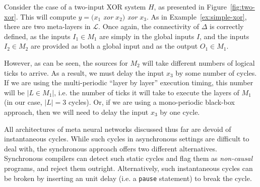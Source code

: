 \begin{example}
	\label{ex:timing}
	Consider the case of a two-input XOR system $H$, as presented in Figure~\ref{fig:two-xor}.
	This will compute $y = \big(x_1$ \textit{xor} $x_2\big)$ \textit{xor} $x_3$.
	As in Example~\ref{ex:simple-xor}, there are two meta-layers in $\mathcal{L}$. 
	Once again, the connectivity of $\Delta$ is correctly defined, as the inputs $I_1 \in M_1$ are simply in the global inputs $I$, and the inputs $I_2 \in M_2$ are provided as both a global input and as the output $O_1 \in M_1$.  
	
	However, as can be seen, the sources for $M_2$ will take different numbers of logical ticks to arrive.
	As a result, we must delay the input $x_3$ by some number of cycles.
	If we are using the multi-periodic ``layer by layer'' execution timing, this number will be $|L \in M_1|$, i.e. the number of ticks it will take to execute the layers of $M_1$ (in our case, $|L| = 3$ cycles). 
	Or, if we are using a mono-periodic black-box approach, then we will need to delay the input $x_3$ by one cycle.
\end{example}

All architectures of meta neural networks discussed thus far are
devoid of instantaneous cycles. While such cycles in asynchronous settings are difficult
to deal with, the synchronous approach offers two different
alternatives. Synchronous compilers can detect such static cycles and flag
them as \emph{non-causal}~\cite{benveniste2003synchronous} programs, and reject them outright. Alternatively, such instantaneous cycles
can be broken by inserting an unit delay (i.e. a \texttt{pause}
statement) to break the cycle.






